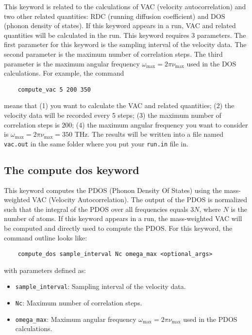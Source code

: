 \documentclass[12pt,a4paper]{report}
\begin{document}
This keyword is related to the calculations of VAC (velocity autocorrelation) and two other related quantities: RDC (running diffusion coefficient) and DOS (phonon density of states).
If this keyword appears in a run, VAC and related quantities will be calculated in the run. This keyword requires 3 parameters.
The first parameter for this keyword is the sampling interval of the velocity data. The second parameter is the maximum number of correlation steps. The third parameter is the maximum angular frequency $\omega_{\text{max}}=2\pi \nu_{\text{max}}$ used in the DOS calculations. For example, the command
\begin{verbatim}
    compute_vac 5 200 350
\end{verbatim}
means that (1) you want to calculate the VAC and related quantities; (2) the velocity data will be recorded every 5 steps; (3) the maximum number of correlation steps is $200$; (4) the maximum angular frequency you want to consider is $\omega_{\text{max}}=2\pi \nu_{\text{max}}= 350$ THz. The results will be written into a file named \verb"vac.out" in the same folder where you put your \verb"run.in" file in.


\subsection{The compute dos keyword}

This keyword computes the PDOS (Phonon Density Of States) using the mass-weighted VAC (Velocity Autocorrelation). The output of the PDOS is normalized such that the integral of the PDOS over all frequencies equals $3N$, where $N$ is the number of atoms. If this keyword appears in a run, the mass-weighted VAC will be computed and directly used to compute the PDOS. For this keyword, the command outline looks like:
\begin{verbatim}
    compute_dos sample_interval Nc omega_max <optional_args>
\end{verbatim}

\raggedright with parameters defined as:
\begin{itemize}
  \item \verb"sample_interval": Sampling interval of the velocity data.
  \item \verb"Nc": Maximum number of correlation steps.
  \item \verb"omega_max": Maximum angular frequency $\omega_{\text{max}}=2\pi \nu_{\text{max}}$ used in the PDOS calculations.
\end{itemize}
\end{document}
